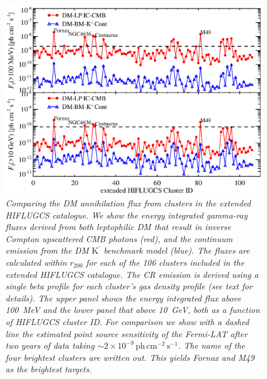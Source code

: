 \documentclass[10pt,aps,pra,reprint,amsmath,amsfonts,amssymb,showpacs,nofootinbib,floatfix]{revtex4-1}
\newcommand{\rmn}{\mathrm}
\newcommand{\Kp}{\rmn{K}^\prime}
\newcommand{\rvir}{r_{200}}
\begin{document}
\begin{figure}%
\begin{minipage}{2.0\columnwidth}
 \includegraphics[width=0.99\columnwidth]{figures/Flux.comp.DM.eps}
\caption{\it Comparing the DM annihilation flux from clusters in the
  extended HIFLUGCS catalogue. We show the energy integrated gamma-ray
  fluxes derived from both leptophilic DM that result in inverse
  Compton upscattered CMB photons (red), and the continuum emission
  from the DM $\Kp$ benchmark model (blue). The fluxes are calculated
  within $\rvir$ for each of the 106 clusters included in the extended
  HIFLUGCS catalogue. The CR emission is derived using a single beta
  profile for each cluster's gas density profile (see text for
  details). The upper panel shows the energy integrated flux above
  100~MeV and the lower panel that above 10~GeV, both as a function of
  HIFLUGCS cluster ID. For comparison we show with a dashed line the
  estimated point source sensitivity of the Fermi-LAT after two years
  of data taking $\sim
  2\times10^{-9}\,\rmn{ph}\,\rmn{cm}^{-2}\,\rmn{s}^{-1}$. The name of
  the four brightest clusters are written out. This yields Fornax and
  M49 as the brightest targets.}
 \label{fig21}
\end{minipage}
\end{figure}
\end{document}

